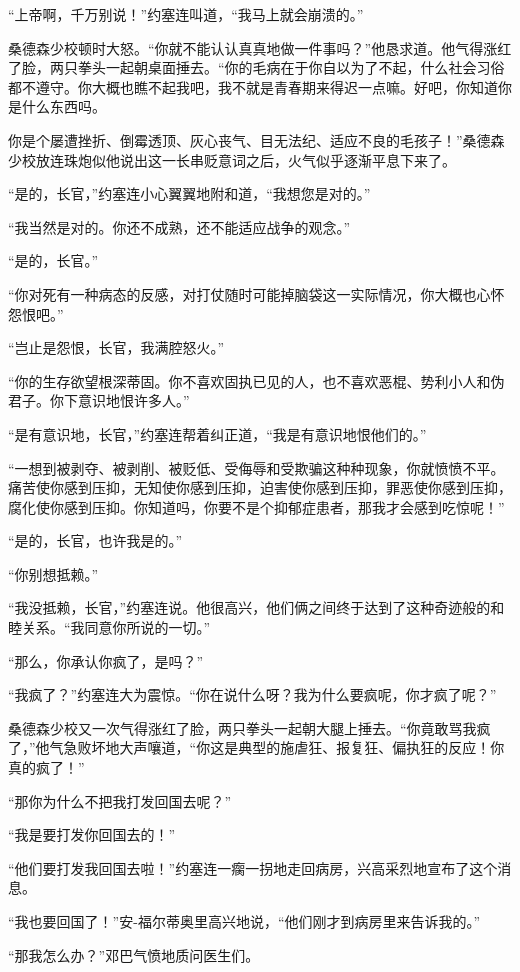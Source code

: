     “上帝啊，千万别说！”约塞连叫道，“我马上就会崩溃的。”

    桑德森少校顿时大怒。“你就不能认认真真地做一件事吗？”他恳求道。他气得涨红了脸，两只拳头一起朝桌面捶去。“你的毛病在于你自以为了不起，什么社会习俗都不遵守。你大概也瞧不起我吧，我不就是青春期来得迟一点嘛。好吧，你知道你是什么东西吗。

    你是个屡遭挫折、倒霉透顶、灰心丧气、目无法纪、适应不良的毛孩子！”桑德森少校放连珠炮似他说出这一长串贬意词之后，火气似乎逐渐平息下来了。

    “是的，长官，”约塞连小心翼翼地附和道，“我想您是对的。”

    “我当然是对的。你还不成熟，还不能适应战争的观念。”

    “是的，长官。”

    “你对死有一种病态的反感，对打仗随时可能掉脑袋这一实际情况，你大概也心怀怨恨吧。”

    “岂止是怨恨，长官，我满腔怒火。”

    “你的生存欲望根深蒂固。你不喜欢固执已见的人，也不喜欢恶棍、势利小人和伪君子。你下意识地恨许多人。”

    “是有意识地，长官，”约塞连帮着纠正道，“我是有意识地恨他们的。”

    “一想到被剥夺、被剥削、被贬低、受侮辱和受欺骗这种种现象，你就愤愤不平。痛苦使你感到压抑，无知使你感到压抑，迫害使你感到压抑，罪恶使你感到压抑，腐化使你感到压抑。你知道吗，你要不是个抑郁症患者，那我才会感到吃惊呢！”

    “是的，长官，也许我是的。”

    “你别想抵赖。”

    “我没抵赖，长官，”约塞连说。他很高兴，他们俩之间终于达到了这种奇迹般的和睦关系。“我同意你所说的一切。”

    “那么，你承认你疯了，是吗？”

    “我疯了？”约塞连大为震惊。“你在说什么呀？我为什么要疯呢，你才疯了呢？”

    桑德森少校又一次气得涨红了脸，两只拳头一起朝大腿上捶去。“你竟敢骂我疯了，”他气急败坏地大声嚷道，“你这是典型的施虐狂、报复狂、偏执狂的反应！你真的疯了！”

    “那你为什么不把我打发回国去呢？”

    “我是要打发你回国去的！”

    “他们要打发我回国去啦！”约塞连一瘸一拐地走回病房，兴高采烈地宣布了这个消息。

    “我也要回国了！”安-福尔蒂奥里高兴地说，“他们刚才到病房里来告诉我的。”

    “那我怎么办？”邓巴气愤地质问医生们。

